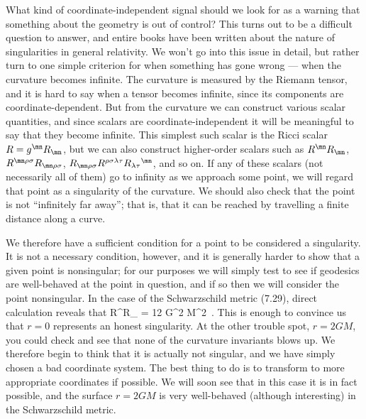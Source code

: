 \documentclass[12pt]{article}
\begin{document}
What kind of coordinate-independent signal should
we look for as a warning that something about the geometry is out of
control?  This turns out to be a difficult question to answer, and
entire books have been written about the nature of singularities in
general relativity.  We won't go into this issue in detail, but
rather turn to one simple criterion for when something has gone wrong ---
when the curvature becomes infinite.  The curvature is measured by
the Riemann tensor, and it is hard to say when a tensor becomes infinite,
since its components are coordinate-dependent.  But from the curvature
we can construct various scalar quantities, and since scalars are
coordinate-independent it will be meaningful to say that they become
infinite.  This simplest such scalar is the Ricci scalar $R=g^\mn R_\mn$,
but we can also construct higher-order scalars such as $R^\mn R_\mn$,
$R^{\mn\rho\sigma}R_{\mn\rho\sigma}$, $R_{\mn\rho\sigma}
R^{\rho\sigma\lambda\tau} R_{\lambda\tau}{}^{\mn}$, and so on.  If any
of these scalars (not necessarily all of them) go to infinity as we
approach some point, we will regard that point as a singularity of the
curvature.  We should also check that the point is not ``infinitely
far away''; that is, that it can be reached by travelling a finite 
distance along a curve.

We therefore have a sufficient condition for a point to be considered
a singularity.  It is not a necessary condition, however, and it is
generally harder to show that a given point is nonsingular; for our 
purposes we will simply test to see if geodesics are well-behaved at 
the point in
question, and if so then we will consider the point nonsingular.
In the case of the Schwarzschild metric (7.29), direct 
calculation reveals that
\be
  R^{\mn\rho\sigma}R_{\mn\rho\sigma} = {{12 G^2 M^2}}\ .
  \label{7.30}
\ee
This is enough to convince us that $r=0$ represents an honest 
singularity.  At the other trouble spot, $r=2GM$, you could check
and see that none of the curvature invariants blows up.  We therefore
begin to think that it is actually not singular, and we have simply
chosen a bad coordinate system.  The best thing to do is to transform
to more appropriate coordinates if possible.  We will soon see that
in this case it is in fact possible, and the surface $r=2GM$ is 
very well-behaved (although interesting) in the Schwarzschild metric.
\end{document}
